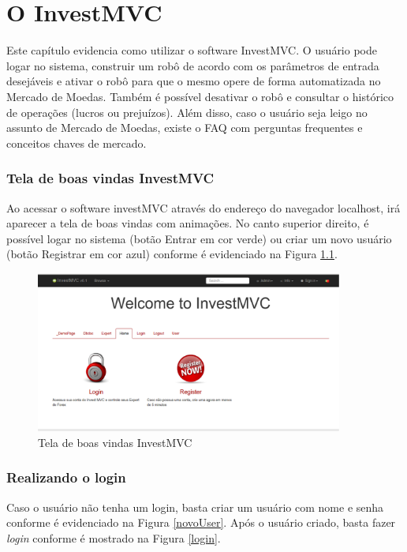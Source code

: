 \chapter{O InvestMVC}
Este capítulo evidencia como utilizar o software InvestMVC. O usuário pode logar no sistema, construir um robô de acordo com os parâmetros de entrada desejáveis e ativar o robô para que o mesmo opere de forma automatizada no Mercado de Moedas. Também é possível desativar o robô e consultar o histórico de operações (lucros ou prejuízos). Além disso, caso o usuário seja leigo no assunto de Mercado de Moedas, existe o FAQ com perguntas frequentes e conceitos chaves de mercado.


\subsection{Tela de boas vindas InvestMVC}

Ao acessar o software investMVC através do endereço do navegador localhost, irá aparecer a tela de boas vindas com animações. No canto superior direito, é possível logar no sistema (botão Entrar em cor verde) ou criar um novo usuário (botão Registrar em cor azul) conforme é evidenciado na Figura \ref{telaInicial}.

\begin{figure}[H]
\centering
\includegraphics[width=0.9\textwidth]{figuras/telaInicial}
\caption{Tela de boas vindas InvestMVC}
\label{telaInicial}
\end{figure}

\subsection{Realizando o login}

Caso o usuário não tenha um login, basta criar um usuário com nome e senha conforme é evidenciado na Figura \ref{novoUser}. Após o usuário criado, basta fazer \textit{login} conforme é mostrado na Figura \ref{login}.

